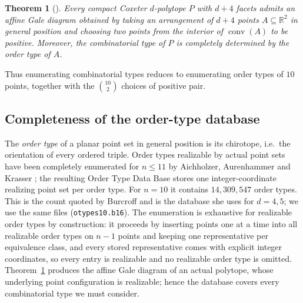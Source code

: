 \documentclass[11pt,reqno]{amsart}
\theoremstyle{plain}
\newtheorem{theorem}{Theorem}[section]
\theoremstyle{definition}
\DeclareMathOperator{\conv}{conv}
\newcommand{\RR}{\mathbb{R}}
\newcommand{\NumOrderTypes}{14{,}309{,}547}
\begin{document}
\begin{theorem}[{\cite[Thm.~3.5]{Burcroff2024}}]
\label{thm:burcroff35}
Every compact Coxeter $d$-polytope $P$ with $d+4$ facets admits an affine Gale
diagram obtained by taking an arrangement of $d+4$ points $A\subseteq\RR^2$ in
general position and choosing two points from the interior of $\conv(A)$ to be
positive. Moreover, the combinatorial type of $P$ is completely determined by
the order type of $A$.
\end{theorem}

Thus enumerating combinatorial types reduces to enumerating order types of $10$
points, together with the $\binom{10}{2}$ choices of positive pair.

\subsection{Completeness of the order-type database}
\label{sec:aak}

The \emph{order type} of a planar point set in general position is its
chirotope, i.e.\ the orientation of every ordered triple. Order types realizable
by actual point sets have been completely enumerated for $n\le 11$ by
Aichholzer, Aurenhammer and Krasser
\cite{AichholzerAurenhammerKrasser2002,AichholzerKrasser2001}; the resulting
Order Type Data Base \cite{OrderTypeDB} stores one integer-coordinate realizing
point set per order type. For $n=10$ it contains $\NumOrderTypes$ order types.
This is the count quoted by Burcroff \cite[\S3]{Burcroff2024} and is the
database she uses for $d=4,5$; we use the same files
(\texttt{otypes10.b16}). The enumeration is exhaustive for realizable order
types by construction: it proceeds by inserting points one at a time into all
realizable order types on $n-1$ points and keeping one representative per
equivalence class, and every stored representative comes with explicit integer
coordinates, so every entry is realizable and no realizable order type is
omitted. Theorem~\ref{thm:burcroff35} produces the affine Gale diagram of an
actual polytope, whose underlying point configuration is realizable; hence the
database covers every combinatorial type we must consider.
\end{document}
